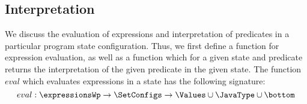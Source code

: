 

\newtheorem{interpExpr}{Definition}[subsection]
\newtheorem{interpTypeExpr}[interpExpr]{Definition} 
\newtheorem{interpPred}[interpExpr]{Definition}
\newtheorem{valid}[interpExpr]{Definition}

\subsection{Interpretation }\label{interpret}

We discuss the evaluation of expressions and interpretation of predicates  in a particular program state configuration.
Thus, we first define a function for expression evaluation, as well as a function which for a given state and predicate returns the interpretation
of the given predicate in the given state. 
The function $eval$ which evaluates expressions in a state has the following signature:
$$
eval : \expressionsWp \rightarrow \SetConfigs \rightarrow \Values \cup \JavaType \cup \bottom
$$



